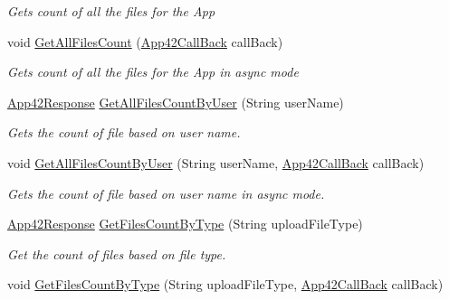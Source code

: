 \begin{DoxyCompactItemize}
\begin{DoxyCompactList}\small\item\em Gets count of all the files for the App \end{DoxyCompactList}\item 
void \hyperlink{classcom_1_1shephertz_1_1app42_1_1paas_1_1sdk_1_1csharp_1_1upload_1_1_upload_service_ab3ba6a84c07d876f27c776a67a509453}{Get\+All\+Files\+Count} (\hyperlink{interfacecom_1_1shephertz_1_1app42_1_1paas_1_1sdk_1_1csharp_1_1_app42_call_back}{App42\+Call\+Back} call\+Back)
\begin{DoxyCompactList}\small\item\em Gets count of all the files for the App in async mode \end{DoxyCompactList}\item 
\hyperlink{classcom_1_1shephertz_1_1app42_1_1paas_1_1sdk_1_1csharp_1_1_app42_response}{App42\+Response} \hyperlink{classcom_1_1shephertz_1_1app42_1_1paas_1_1sdk_1_1csharp_1_1upload_1_1_upload_service_ae709b757d8561861616313a201e52d17}{Get\+All\+Files\+Count\+By\+User} (String user\+Name)
\begin{DoxyCompactList}\small\item\em Gets the count of file based on user name. \end{DoxyCompactList}\item 
void \hyperlink{classcom_1_1shephertz_1_1app42_1_1paas_1_1sdk_1_1csharp_1_1upload_1_1_upload_service_ac7734168ab621605d2194bb565957669}{Get\+All\+Files\+Count\+By\+User} (String user\+Name, \hyperlink{interfacecom_1_1shephertz_1_1app42_1_1paas_1_1sdk_1_1csharp_1_1_app42_call_back}{App42\+Call\+Back} call\+Back)
\begin{DoxyCompactList}\small\item\em Gets the count of file based on user name in async mode. \end{DoxyCompactList}\item 
\hyperlink{classcom_1_1shephertz_1_1app42_1_1paas_1_1sdk_1_1csharp_1_1_app42_response}{App42\+Response} \hyperlink{classcom_1_1shephertz_1_1app42_1_1paas_1_1sdk_1_1csharp_1_1upload_1_1_upload_service_a790fe227b475ba002d8c7aa26598f38b}{Get\+Files\+Count\+By\+Type} (String upload\+File\+Type)
\begin{DoxyCompactList}\small\item\em Get the count of files based on file type. \end{DoxyCompactList}\item 
void \hyperlink{classcom_1_1shephertz_1_1app42_1_1paas_1_1sdk_1_1csharp_1_1upload_1_1_upload_service_a73aed4177305c1b2caf666b40f36c599}{Get\+Files\+Count\+By\+Type} (String upload\+File\+Type, \hyperlink{interfacecom_1_1shephertz_1_1app42_1_1paas_1_1sdk_1_1csharp_1_1_app42_call_back}{App42\+Call\+Back} call\+Back)

\end{DoxyCompactItemize}
